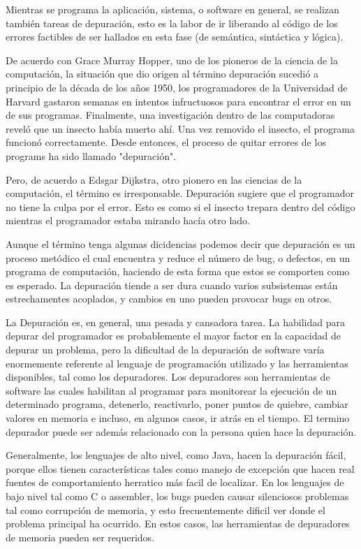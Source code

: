\documentclass[12pt,legalpaper]{report}
\begin{document}
Mientras se programa la aplicación, sistema, o software en general, se realizan también tareas de depuración, esto es la labor de ir liberando al código de los errores factibles de ser hallados en esta fase (de semántica, sintáctica y lógica). 

De acuerdo con Grace Murray Hopper, uno de los pioneros de la ciencia de la computación, la situación que dio origen al término depuración sucedió a principio de la década de los años 1950, los programadores de la Universidad de Harvard gastaron semanas en intentos infructuosos para encontrar el error en un de sus programas. Finalmente, una investigación dentro de las computadoras reveló que un insecto había muerto ahí. Una vez removido el insecto, el programa funcionó correctamente. Desde entonces, el proceso de quitar errores de los programs ha sido llamado "depuración".

Pero, de acuerdo a Edsgar Dijkstra, otro pionero en las ciencias de la computación, el término es irresponsable. Depuración sugiere que el programador no tiene la culpa por el error. Esto es como si el insecto trepara dentro del código mientras el programador estaba mirando hacía otro lado.

Aunque el término tenga algunas dicidencias podemos decir que depuración es un proceso metódico el cual encuentra y reduce el número de bug, o defectos, en un programa de computación, haciendo de esta forma que estos se comporten como es esperado.  La depuración tiende a ser dura cuando varios subsistemas están estrechamentes acoplados, y cambios en uno pueden provocar bugs en otros.

La Depuración es, en general, una pesada y cansadora tarea.  La habilidad para depurar del programador es probablemente el mayor factor en la capacidad de depurar un problema, pero la dificultad de la depuración de software varía enormemente referente al lenguaje de programación utilizado y las herramientas disponibles, tal como los depuradores.  Los depuradores son herramientas de software las cuales habilitan al programar para monitorear la ejecución de un determinado programa, detenerlo, reactivarlo, poner puntos de quiebre, cambiar valores en memoria e incluso, en algunos casos, ir atrás en el tiempo.  El termino depurador puede ser además relacionado con la persona quien hace la depuración.

Generalmente, los lenguajes de alto nivel, como Java, hacen la depuración fácil, porque ellos tienen características tales como manejo de excepción que hacen real fuentes de comportamiento herratico más facil de localizar.  En los lenguajes de bajo nivel tal como C o assembler, los bugs pueden causar silenciosos problemas tal como corrupción de memoria, y esto frecuentemente dificil ver donde el problema principal ha ocurrido.  En estos casos, las herramientas de depuradores de memoria pueden ser requeridos.
\end{document}
